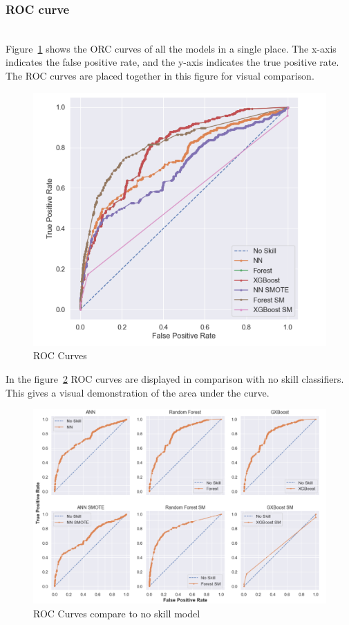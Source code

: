 \subsubsection{ROC curve}\hspace*{\fill} \\
Figure~\ref {fig:roc_all} shows the ORC curves of all the models in a single place. The x-axis indicates the false positive rate, and the y-axis indicates the true positive rate. The ROC curves are placed together in this figure for visual comparison. 
\begin{figure}[h]
    \centering
    \includegraphics[width=\linewidth]{figures/roc_res.PNG}
    \caption{ROC Curves}
    \label{fig:roc_all}
\end{figure}

In the figure~\ref{fig:roc_all_2} ROC curves are displayed in comparison with no skill classifiers. This gives a visual demonstration of the area under the curve. 
\begin{figure}[h]
    \centering
    \includegraphics[width=\linewidth]{figures/roc_res_full.PNG}
    \caption{ROC Curves compare to no skill model}
    \label{fig:roc_all_2}
\end{figure}


